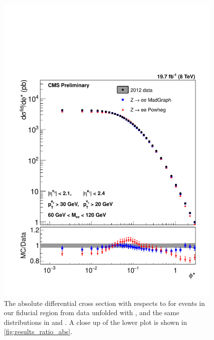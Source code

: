 \begin{figure}[!p]
    \centering
    \includegraphics[width=\textwidth]{figures/ZShape_elec_Abs_Dressed.pdf}
    \caption[
        The absolute differential cross section with respects to \phistar for
        \Ztoee events in our fiducial region from data unfolded with \MADGRAPH,
        and the same distributions in \MADGRAPH and \POWHEG.
    ]{
        The absolute differential cross section with respects to \phistar for
        \Ztoee events in our fiducial region from data unfolded with \MADGRAPH,
        and the same distributions in \MADGRAPH and \POWHEG. A close up of the
        lower plot is shown in \cref{fig:results_ratio_abs}.
    }
    \label{fig:results_abs}
\end{figure}

